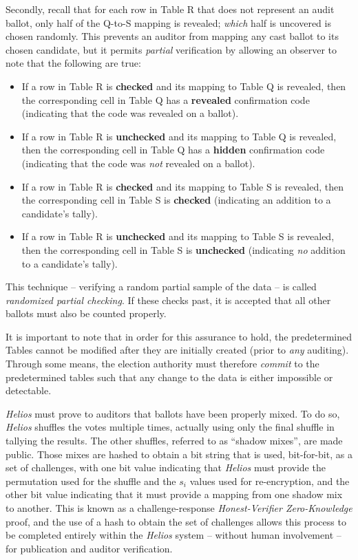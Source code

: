 \documentclass[10pt,twocolumn]{article}
\newcommand{\term}[1]{\textit{#1}}
\begin{document}
Secondly, recall that for each row in Table R that does not represent an audit ballot, only half of
the Q-to-S mapping is revealed; \emph{which} half is uncovered is chosen randomly. This prevents an
auditor from mapping any cast ballot to its chosen candidate, but it permits \emph{partial}
verification by allowing an observer to note that the following are true:
\begin{itemize}
	\item
		If a row in Table R is \textbf{checked} and its mapping to Table Q is revealed, then the
		corresponding cell in Table Q has a \textbf{revealed} confirmation code (indicating that the
		code was revealed on a ballot).
	\item
		If a row in Table R is \textbf{unchecked} and its mapping to Table Q is revealed, then the
		corresponding cell in Table Q has a \textbf{hidden} confirmation code (indicating that the code
		was \emph{not} revealed on a ballot).
	\item
		If a row in Table R is \textbf{checked} and its mapping to Table S is revealed, then the
		corresponding cell in Table S is \textbf{checked} (indicating an addition to a candidate's
		tally).
	\item
		If a row in Table R is \textbf{unchecked} and its mapping to Table S is revealed, then the
		corresponding cell in Table S is \textbf{unchecked} (indicating \emph{no} addition to a
		candidate's tally).
\end{itemize}
This technique -- verifying a random partial sample of the data -- is called \term{randomized partial
checking}. If these checks past, it is accepted that all other ballots must also be counted properly.

It is important to note that in order for this assurance to hold, the predetermined Tables cannot be
modified after they are initially created (prior to \emph{any} auditing). Through some means, the
election authority must therefore \term{commit} to the predetermined tables such that any change to
the data is either impossible or detectable.

\term{Helios} must prove to auditors that ballots have been properly mixed. To do so, \term{Helios}
shuffles the votes multiple times, actually using only the final shuffle in tallying the results.
The other shuffles, referred to as ``shadow mixes'', are made public. Those mixes are hashed to
obtain a bit string that is used, bit-for-bit, as a set of challenges, with one bit value indicating
that \term{Helios} must provide the permutation used for the shuffle and the $s_{i}$ values used for
re-encryption, and the other bit value indicating that it must provide a mapping from one shadow mix
to another. This is known as a challenge-response \term{Honest-Verifier Zero-Knowledge} proof, and the
use of a hash to obtain the set of challenges allows this process to be completed entirely within
the \term{Helios} system -- without human involvement -- for publication and auditor verification.
\end{document}
